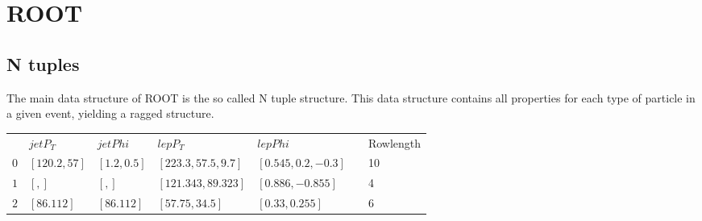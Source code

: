 \section{ROOT}
\subsection*{N tuples}

The main data structure of ROOT is the so called N tuple structure. This data structure contains all properties for each type of particle in a given event, yielding
a ragged structure. 

\begin{table}[H]
    \begin{tabular}{|l|l|l|l|l|l|l|}
    \cline{1-5} \cline{7-7}
        & $jetP_T$      & $jetPhi$     & $lepP_T$             & $lepPhi$             &  & Rowlength \\ \cline{1-5} \cline{7-7} 
    $0$ & $[120.2, 57]$ & $[1.2, 0.5]$ & $[223.3, 57.5, 9.7]$ & $[0.545, 0.2, -0.3]$ &  & 10        \\ \cline{1-5} \cline{7-7} 
    $1$ & $[, ]$          & $[, ]$         & $[121.343, 89.323]$  & $[0.886, -0.855]$    &  & 4         \\ \cline{1-5} \cline{7-7} 
    $2$ & $[86.112]$    & $[86.112]$   & $[57.75, 34.5]$      & $[0.33, 0.255]$      &  & 6         \\ \cline{1-5} \cline{7-7} 
    \end{tabular}
\end{table}

